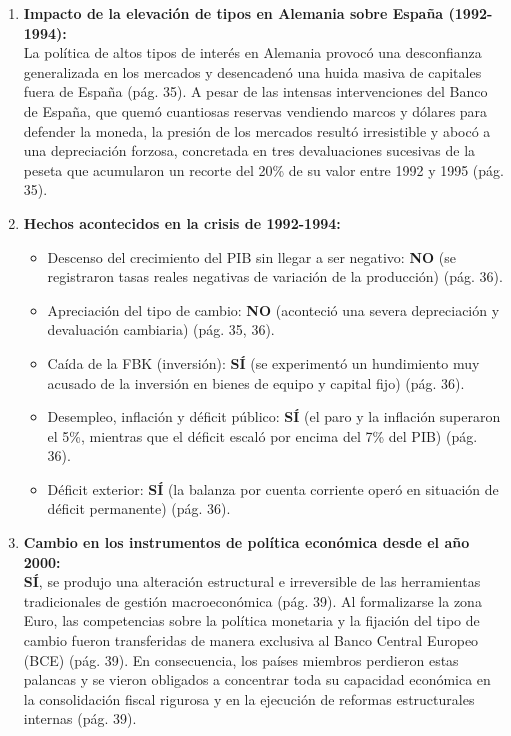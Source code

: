 \begin{enumerate}[label=\arabic*.]
    \item \textbf{Impacto de la elevación de tipos en Alemania sobre España (1992-1994):} \\
    La política de altos tipos de interés en Alemania provocó una desconfianza generalizada en los mercados y desencadenó una huida masiva de capitales fuera de España (pág. 35). A pesar de las intensas intervenciones del Banco de España, que quemó cuantiosas reservas vendiendo marcos y dólares para defender la moneda, la presión de los mercados resultó irresistible y abocó a una depreciación forzosa, concretada en tres devaluaciones sucesivas de la peseta que acumularon un recorte del 20\% de su valor entre 1992 y 1995 (pág. 35).

    \item \textbf{Hechos acontecidos en la crisis de 1992-1994:}
    \begin{itemize}
        \item Descenso del crecimiento del PIB sin llegar a ser negativo: \textbf{NO} (se registraron tasas reales negativas de variación de la producción) (pág. 36).
        \item Apreciación del tipo de cambio: \textbf{NO} (aconteció una severa depreciación y devaluación cambiaria) (pág. 35, 36).
        \item Caída de la FBK (inversión): \textbf{SÍ} (se experimentó un hundimiento muy acusado de la inversión en bienes de equipo y capital fijo) (pág. 36).
        \item Desempleo, inflación y déficit público: \textbf{SÍ} (el paro y la inflación superaron el 5\%, mientras que el déficit escaló por encima del 7\% del PIB) (pág. 36).
        \item Déficit exterior: \textbf{SÍ} (la balanza por cuenta corriente operó en situación de déficit permanente) (pág. 36).
    \end{itemize}

    \item \textbf{Cambio en los instrumentos de política económica desde el año 2000:} \\
    \textbf{SÍ}, se produjo una alteración estructural e irreversible de las herramientas tradicionales de gestión macroeconómica (pág. 39). Al formalizarse la zona Euro, las competencias sobre la política monetaria y la fijación del tipo de cambio fueron transferidas de manera exclusiva al Banco Central Europeo (BCE) (pág. 39). En consecuencia, los países miembros perdieron estas palancas y se vieron obligados a concentrar toda su capacidad económica en la consolidación fiscal rigurosa y en la ejecución de reformas estructurales internas (pág. 39).


\end{enumerate}
